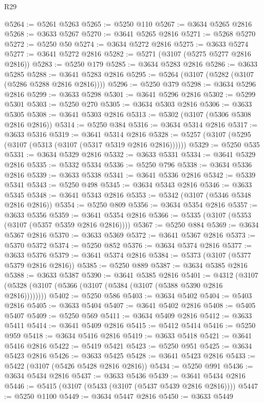 \begin{lexlean}{R29}
\begin{coremodule}
@5264 := @5261 @5263
@5265 := @5250 @110
@5267 := @3634 @5265 @2816
@5268 := @3633 @5267
@5270 := @3641 @5265 @2816
@5271 := @5268 @5270
@5272 := @5250 @50
@5274 := @3634 @5272 @2816
@5275 := @3633 @5274
@5277 := @3641 @5272 @2816
@5282 := @5271 (@3107 (@5275 @5277 @2816 @2816))
@5283 := @5250 @179
@5285 := @3634 @5283 @2816
@5286 := @3633 @5285
@5288 := @3641 @5283 @2816
@5295 := @5264 (@3107 (@5282 (@3107 (@5286 @5288 @2816 @2816))))
@5296 := @5250 @379
@5298 := @3634 @5296 @2816
@5299 := @3633 @5298
@5301 := @3641 @5296 @2816
@5302 := @5299 @5301
@5303 := @5250 @270
@5305 := @3634 @5303 @2816
@5306 := @3633 @5305
@5308 := @3641 @5303 @2816
@5313 := @5302 (@3107 (@5306 @5308 @2816 @2816))
@5314 := @5250 @384
@5316 := @3634 @5314 @2816
@5317 := @3633 @5316
@5319 := @3641 @5314 @2816
@5328 := @5257 (@3107 (@5295 (@3107 (@5313 (@3107 (@5317 @5319 @2816 @2816))))))
@5329 := @5250 @535
@5331 := @3634 @5329 @2816
@5332 := @3633 @5331
@5334 := @3641 @5329 @2816
@5335 := @5332 @5334
@5336 := @5250 @796
@5338 := @3634 @5336 @2816
@5339 := @3633 @5338
@5341 := @3641 @5336 @2816
@5342 := @5339 @5341
@5343 := @5250 @498
@5345 := @3634 @5343 @2816
@5346 := @3633 @5345
@5348 := @3641 @5343 @2816
@5353 := @5342 (@3107 (@5346 @5348 @2816 @2816))
@5354 := @5250 @809
@5356 := @3634 @5354 @2816
@5357 := @3633 @5356
@5359 := @3641 @5354 @2816
@5366 := @5335 (@3107 (@5353 (@3107 (@5357 @5359 @2816 @2816))))
@5367 := @5250 @884
@5369 := @3634 @5367 @2816
@5370 := @3633 @5369
@5372 := @3641 @5367 @2816
@5373 := @5370 @5372
@5374 := @5250 @852
@5376 := @3634 @5374 @2816
@5377 := @3633 @5376
@5379 := @3641 @5374 @2816
@5384 := @5373 (@3107 (@5377 @5379 @2816 @2816))
@5385 := @5250 @889
@5387 := @3634 @5385 @2816
@5388 := @3633 @5387
@5390 := @3641 @5385 @2816
@5401 := @4312 (@3107 (@5328 (@3107 (@5366 (@3107 (@5384 (@3107 (@5388 @5390 @2816 @2816))))))))
@5402 := @5250 @586
@5403 := @3634 @5402
@5404 := @5403 @2816
@5405 := @3633 @5404
@5407 := @3641 @5402 @2816
@5408 := @5405 @5407
@5409 := @5250 @569
@5411 := @3634 @5409 @2816
@5412 := @3633 @5411
@5414 := @3641 @5409 @2816
@5415 := @5412 @5414
@5416 := @5250 @959
@5418 := @3634 @5416 @2816
@5419 := @3633 @5418
@5421 := @3641 @5416 @2816
@5422 := @5419 @5421
@5423 := @5250 @951
@5425 := @3634 @5423 @2816
@5426 := @3633 @5425
@5428 := @3641 @5423 @2816
@5433 := @5422 (@3107 (@5426 @5428 @2816 @2816))
@5434 := @5250 @991
@5436 := @3634 @5434 @2816
@5437 := @3633 @5436
@5439 := @3641 @5434 @2816
@5446 := @5415 (@3107 (@5433 (@3107 (@5437 @5439 @2816 @2816))))
@5447 := @5250 @1100
@5449 := @3634 @5447 @2816
@5450 := @3633 @5449

\end{coremodule}
\end{lexlean}
